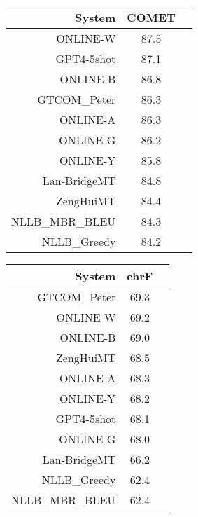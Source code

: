 \documentclass[11pt]{article}
\begin{document}
\begin{table}  
\scriptsize
\begin{subtable}[t]{0.33\textwidth}
\begin{tabular}{rcc}
\toprule 
System  & COMET \\ 
\midrule 
\rowcolor{ashgrey} ONLINE-W  & 87.5 \\ 
\rowcolor{ashgrey} GPT4-5shot  & 87.1 \\ 
\rowcolor{ashgrey} ONLINE-B  & 86.8 \\ 
\rowcolor{ashgrey} GTCOM\_Peter  & 86.3 \\ 
\rowcolor{ashgrey} ONLINE-A  & 86.3 \\ 
\rowcolor{ashgrey} ONLINE-G  & 86.2 \\ 
\rowcolor{ashgrey} ONLINE-Y  & 85.8 \\ 
\rowcolor{ashgrey} Lan-BridgeMT  & 84.8 \\ 
\rowcolor{ashgrey} ZengHuiMT  & 84.4 \\ 
\rowcolor{ashgrey} NLLB\_MBR\_BLEU  & 84.3 \\ 
\rowcolor{ashgrey} NLLB\_Greedy & 84.2 \\ 
\bottomrule 
\end{tabular} 
\end{subtable}
\begin{subtable}[t]{0.33\textwidth}
\begin{tabular}{rcc}
\toprule 
System  & chrF \\ 
\midrule 
\rowcolor{ashgrey} GTCOM\_Peter  & 69.3 \\ 
\rowcolor{ashgrey} ONLINE-W  & 69.2 \\ 
\rowcolor{ashgrey} ONLINE-B  & 69.0 \\ 
\rowcolor{ashgrey} ZengHuiMT  & 68.5 \\ 
\rowcolor{ashgrey} ONLINE-A  & 68.3 \\ 
\rowcolor{ashgrey} ONLINE-Y  & 68.2 \\ 
\rowcolor{ashgrey} GPT4-5shot  & 68.1 \\ 
\rowcolor{ashgrey} ONLINE-G  & 68.0 \\ 
\rowcolor{ashgrey} Lan-BridgeMT  & 66.2 \\ 
\rowcolor{ashgrey} NLLB\_Greedy  & 62.4 \\ 
\rowcolor{ashgrey} NLLB\_MBR\_BLEU  & 62.4 \\ 
\bottomrule 
\end{tabular} 
\end{subtable} 
\begin{subtable}[t]{0.33\textwidth}

\end{subtable}
\end{table}
\end{document}
